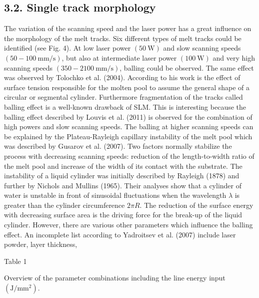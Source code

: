 \documentclass[10pt]{article}
\begin{document}
\subsection*{3.2. Single track morphology}
The variation of the scanning speed and the laser power has a great influence on the morphology of the melt tracks. Six different types of melt tracks could be identified (see Fig. 4). At low laser power $(50 \mathrm{~W})$ and slow scanning speeds $(50-100 \mathrm{~mm} / \mathrm{s})$, but also at intermediate laser power $(100 \mathrm{~W})$ and very high scanning speeds $(350-2100 \mathrm{~mm} / \mathrm{s})$, balling could be observed. The same effect was observed by Tolochko et al. (2004). According to his work is the effect of surface tension responsible for the molten pool to assume the general shape of a circular or segmental cylinder. Furthermore fragmentation of the tracks called balling effect is a well-known drawback of SLM. This is interesting because the balling effect described by Louvis et al. (2011) is observed for the combination of high powers and slow scanning speeds. The balling at higher scanning speeds can be explained by the Plateau-Rayleigh capillary instability of the melt pool which was described by Gusarov et al. (2007). Two factors normally stabilize the process with decreasing scanning speeds: reduction of the length-to-width ratio of the melt pool and increase of the width of its contact with the substrate. The instability of a liquid cylinder was initially described by Rayleigh (1878) and further by Nichols and Mullins (1965). Their analyses show that a cylinder of water is unstable in front of sinusoidal fluctuations when the wavelength $\lambda$ is greater than the cylinder circumference $2 \pi R$. The reduction of the surface energy with decreasing surface area is the driving force for the break-up of the liquid cylinder. However, there are various other parameters which influence the balling effect. An incomplete list according to Yadroitsev et al. (2007) include laser powder, layer thickness,

Table 1

Overview of the parameter combinations including the line energy input $\left(\mathrm{J} / \mathrm{mm}^{2}\right)$.
\end{document}
